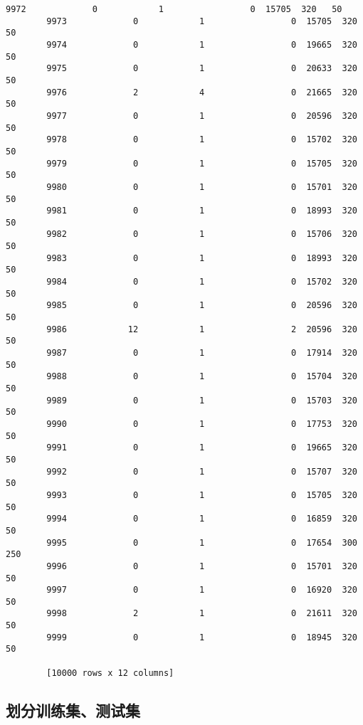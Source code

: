 \documentclass[11pt]{article}
\begin{document}
\begin{Verbatim}[commandchars=\\\{\}]
        9972             0            1                 0  15705  320   50  
        9973             0            1                 0  15705  320   50  
        9974             0            1                 0  19665  320   50  
        9975             0            1                 0  20633  320   50  
        9976             2            4                 0  21665  320   50  
        9977             0            1                 0  20596  320   50  
        9978             0            1                 0  15702  320   50  
        9979             0            1                 0  15705  320   50  
        9980             0            1                 0  15701  320   50  
        9981             0            1                 0  18993  320   50  
        9982             0            1                 0  15706  320   50  
        9983             0            1                 0  18993  320   50  
        9984             0            1                 0  15702  320   50  
        9985             0            1                 0  20596  320   50  
        9986            12            1                 2  20596  320   50  
        9987             0            1                 0  17914  320   50  
        9988             0            1                 0  15704  320   50  
        9989             0            1                 0  15703  320   50  
        9990             0            1                 0  17753  320   50  
        9991             0            1                 0  19665  320   50  
        9992             0            1                 0  15707  320   50  
        9993             0            1                 0  15705  320   50  
        9994             0            1                 0  16859  320   50  
        9995             0            1                 0  17654  300  250  
        9996             0            1                 0  15701  320   50  
        9997             0            1                 0  16920  320   50  
        9998             2            1                 0  21611  320   50  
        9999             0            1                 0  18945  320   50  
        
        [10000 rows x 12 columns]
\end{Verbatim}
            
    \subsection{划分训练集、测试集}\label{ux5212ux5206ux8badux7ec3ux96c6ux6d4bux8bd5ux96c6}
\end{document}
